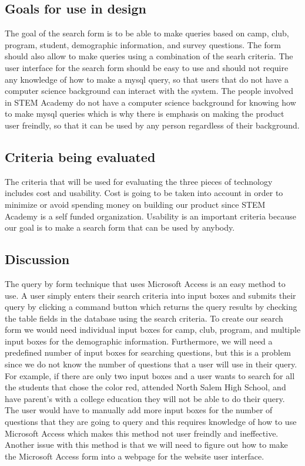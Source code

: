 \documentclass[12pt, draftclsnofoot, onecolumn]{IEEEtran}
\begin{document}
\subsection{Goals for use in design}
The goal of the search form is to be able to make queries based on camp, club, program, student, demographic information, and survey questions. The form should also allow to make queries using a combination of the searh criteria. The user interface for the search form should be easy to use and should not require any knowledge of how to make a mysql query, so that users that do not have a computer science background can interact with the system. The people involved in STEM Academy do not have a computer science background for knowing how to make mysql queries which is why there is emphasis on making the product user freindly, so that it can be used by any person regardless of their background. 


\subsection{Criteria being evaluated}
The criteria that will be used for evaluating the three pieces of technology includes cost and usability. Cost is going to be taken into account in order to minimize or avoid spending money on building our product since STEM Academy is a self funded organization. Usability is an important criteria because our goal is to make a search form that can be used by anybody. 

\subsection{Discussion}
The query by form technique that uses Microsoft Access is an easy method to use. A user simply enters their search criteria into input boxes and submits their query by clicking a command button which returns the query results by checking the table fields in the database using the search criteria. To create our search form we would need individual input boxes for camp, club, program, and multiple input boxes for the demographic information. Furthermore, we will need a predefined number of input boxes for searching questions, but this is a problem since we do not know the number of questions that a user will use in their query. For example, if there are only two input boxes and a user wants to search for all the students that chose the color red, attended North Salem High School, and have parent's with a college education they will not be able to do their query. The user would have to manually add more input boxes for the number of questions that they are going to query and this requires knowledge of how to use Microsoft Access which makes this method not user freindly and ineffective. Another issue with this method is that we will need to figure out how to make the Microsoft Access form into a webpage for the website user interface. 
\end{document}
